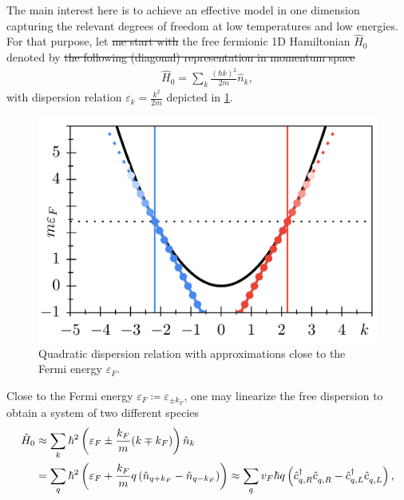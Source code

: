 \documentclass{svmono}
\def\pdag{{\vphantom\dag}}
\newcommand{\brlr}[1]{\left( #1 \right)}
\providecommand{\DIFaddtex}[1]{{\protect\color{blue}\uwave{#1}}} %
\providecommand{\DIFdeltex}[1]{{\protect\color{red}\sout{#1}}}                      %
\providecommand{\DIFaddbegin}{} %
\providecommand{\DIFaddend}{} %
\providecommand{\DIFdelbegin}{} %
\providecommand{\DIFdelend}{} %
\providecommand{\DIFadd}[1]{\texorpdfstring{\DIFaddtex{#1}}{#1}} %
\providecommand{\DIFdel}[1]{\texorpdfstring{\DIFdeltex{#1}}{}} %
\newcommand{\DIFscaledelfig}{0.5}
\newlength{\DIFdelgraphicswidth} %
\newlength{\DIFdelgraphicsheight} %
\newcommand{\DIFaddincludegraphics}[2][]{{\color{blue}\fbox{\DIFOincludegraphics[#1]{#2}}}} %
\newcommand{\DIFdelincludegraphics}[2][]{%
\sbox{\DIFdelgraphicsbox}{\DIFOincludegraphics[#1]{#2}}%
\settoboxwidth{\DIFdelgraphicswidth}{\DIFdelgraphicsbox} %
\settoboxtotalheight{\DIFdelgraphicsheight}{\DIFdelgraphicsbox} %
\scalebox{\DIFscaledelfig}{%
\parbox[b]{\DIFdelgraphicswidth}{\usebox{\DIFdelgraphicsbox}\\[-\baselineskip] \rule{\DIFdelgraphicswidth}{0em}}\llap{\resizebox{\DIFdelgraphicswidth}{\DIFdelgraphicsheight}{%
\setlength{\unitlength}{\DIFdelgraphicswidth}%
\begin{picture}(1,1)%
\thicklines\linethickness{2pt} %
{\color[rgb]{1,0,0}\put(0,0){\framebox(1,1){}}}%
{\color[rgb]{1,0,0}\put(0,0){\line( 1,1){1}}}%
{\color[rgb]{1,0,0}\put(0,1){\line(1,-1){1}}}%
\end{picture}%
}\hspace*{3pt}}} %
} %
\DeclareRobustCommand{\DIFaddbegin}{\DIFOaddbegin \let\includegraphics\DIFaddincludegraphics} %
\DeclareRobustCommand{\DIFaddend}{\DIFOaddend \let\includegraphics\DIFOincludegraphics} %
\DeclareRobustCommand{\DIFdelbegin}{\DIFOdelbegin \let\includegraphics\DIFdelincludegraphics} %
\DeclareRobustCommand{\DIFdelend}{\DIFOaddend \let\includegraphics\DIFOincludegraphics} %
\begin{document}
The main interest here is to achieve an effective model in one dimension capturing the relevant degrees of freedom at low temperatures and low energies.
For that purpose, let \DIFdelbegin \DIFdel{me start with }\DIFdelend \DIFaddbegin \DIFadd{us start from }\DIFaddend the free fermionic 1D Hamiltonian $\hat H_0$ denoted by
\DIFdelbegin \DIFdel{the following (diagonal) representation in momentum space
}%
\DIFdelend \DIFaddbegin \begin{align}
    \hat H_0 = \sum_k \frac{(\hbar k)^2}{2m}\hat n_k,
    \label{eq:hamiltonian_free_particles}
\end{align}\DIFaddend 
with dispersion relation $\varepsilon_k =\frac{k^2}{2m}$ depicted in \cref{fig:1D_quadratic_dispersion}.
\begin{figure}
    \centering
    \includegraphics{figures/1D_quadratic_dispersion.png}
    \caption{Quadratic dispersion relation with approximations close to the Fermi energy $\varepsilon_F$.}
    \label{fig:1D_quadratic_dispersion}
\end{figure}
Close to the Fermi energy $\varepsilon_F\coloneqq\varepsilon_{\pm k_F}$, one may linearize the free dispersion to obtain a system of two different species
\begin{align}
    \hat H_0
    &\approx \sum_k \hbar^2\brlr{\varepsilon_F \pm \frac{k_F}{m}(k\mp k_F)}\hat n_k
    \\
    &= \sum_q \hbar^2\brlr{\varepsilon_F + \frac{k_F}{m}q\brlr{\hat n_{q+k_F}-\hat n_{q-k_F}}}
    \approx \sum_{q} v_F \hbar q \brlr{\hat c^\dag_{q,R}\hat c^\pdag_{q,R} - \hat c^\dag_{q,L}\hat c^\pdag_{q,L}},
    \label{eq:dispersion_linearization}
\end{align}
\end{document}
